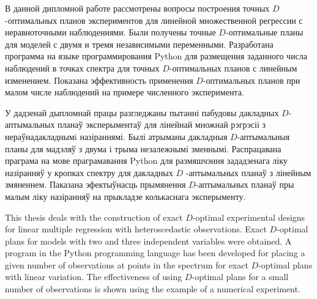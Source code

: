 В данной дипломной работе рассмотрены вопросы построения точных $D$-оптимальных планов экспериментов для линейной множественной регрессии с неравноточными наблюдениями. Были получены точные $D$-оптимальные планы для моделей с двумя и тремя независимыми переменными. Разработана программа на языке программирования Python для размещения заданного числа наблюдений в точках спектра для точных $D$-оптимальных планов с линейным изменением. Показана эффективность применения $D$-оптимальных планов при малом числе наблюдений на примере численного эксперимента. 

У дадзенай дыпломнай працы разгледжаны пытанні пабудовы дакладных $D$- аптымальных планаў эксперыментаў для лінейнай множнай рэгрэсіі з нераўнадакладнымi назіраннямі. Былі атрыманы дакладныя $D$-аптымальныя планы для мадэляў з двума і трыма незалежнымі зменнымі. Распрацавана праграма на мове праграмавання Python для размяшчэння зададзенага ліку назіранняў у кропках спектру для дакладных $D$ -аптымальных планаў з лінейным змяненнем. Паказана эфектыўнасць прымянення $D$-аптымальных планаў пры малым ліку назіранняў на прыкладзе колькаснага эксперыменту.

This thesis deals with the construction of exact $D$-optimal experimental designs for linear multiple regression with heteroscedastic observations. Exact $D$-optimal plans for models with two and three independent variables were obtained. A program in the Python programming language has been developed for placing a given number of observations at points in the spectrum for exact $D$-optimal plans with linear variation. The effectiveness of using $D$-optimal plans for a small number of observations is shown using the example of a numerical experiment.